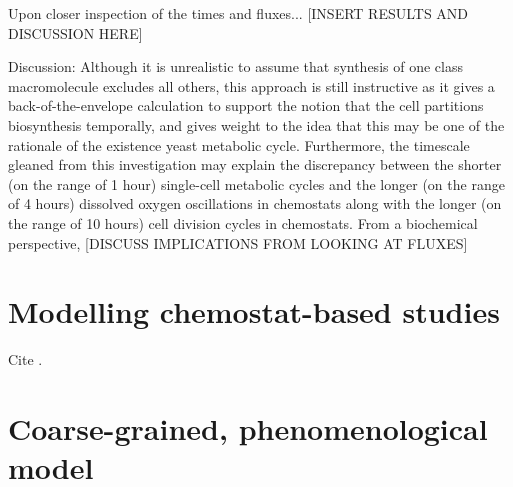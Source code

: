 Upon closer inspection of the times and fluxes... [INSERT RESULTS AND DISCUSSION HERE]

Discussion: Although it is unrealistic to assume that synthesis of one class macromolecule excludes all others, this approach is still instructive as it gives a back-of-the-envelope calculation to support the notion that the cell partitions biosynthesis temporally, and gives weight to the idea that this may be one of the rationale of the existence yeast metabolic cycle.
Furthermore, the timescale gleaned from this investigation may explain the discrepancy between the shorter (on the range of 1 hour) single-cell metabolic cycles and the longer (on the range of 4 hours) dissolved oxygen oscillations in chemostats along with the longer (on the range of 10 hours) cell division cycles in chemostats.
From a biochemical perspective, [DISCUSS IMPLICATIONS FROM LOOKING AT FLUXES]

\section{Modelling chemostat-based studies}
\label{sec:model-chemostat}

Cite \textcite{jonesCyberneticModelGrowth1999}.

\section{Coarse-grained, phenomenological model}
\label{sec:model-coarse}


